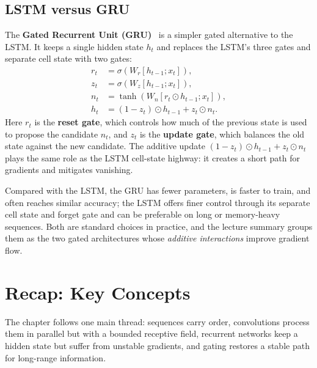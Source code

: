 \subsection{LSTM versus GRU}

The \textbf{Gated Recurrent Unit (GRU)}~\cite{cho2014learning} is a simpler gated alternative to the LSTM. It keeps a single hidden state $h_t$ and replaces the LSTM's three gates and separate cell state with two gates:
\begin{align}
    r_t &= \sigma\left(W_r [h_{t-1}; x_t]\right), \\
    z_t &= \sigma\left(W_z [h_{t-1}; x_t]\right), \\
    n_t &= \tanh\left(W_n [r_t \odot h_{t-1}; x_t]\right), \\
    h_t &= (1-z_t)\odot h_{t-1} + z_t \odot n_t.
\end{align}
Here $r_t$ is the \textbf{reset gate}, which controls how much of the previous state is used to propose the candidate $n_t$, and $z_t$ is the \textbf{update gate}, which balances the old state against the new candidate. The additive update $(1-z_t)\odot h_{t-1} + z_t\odot n_t$ plays the same role as the LSTM cell-state highway: it creates a short path for gradients and mitigates vanishing.

Compared with the LSTM, the GRU has fewer parameters, is faster to train, and often reaches similar accuracy; the LSTM offers finer control through its separate cell state and forget gate and can be preferable on long or memory-heavy sequences. Both are standard choices in practice, and the lecture summary groups them as the two gated architectures whose \emph{additive interactions} improve gradient flow.

\newpage
\section{Recap: Key Concepts}

The chapter follows one main thread: sequences carry order, convolutions process them in parallel but with a bounded receptive field, recurrent networks keep a hidden state but suffer from unstable gradients, and gating restores a stable path for long-range information.

